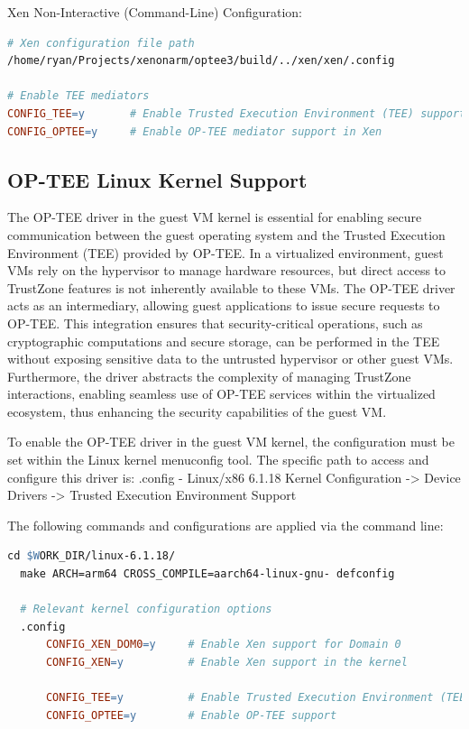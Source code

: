 \documentclass[acmtog]{acmart}
\begin{document}
Xen Non-Interactive (Command-Line) Configuration:
\begin{lstlisting}[language=make, caption=Enable OP-TEE Support in Xen]  
# Xen configuration file path  
/home/ryan/Projects/xenonarm/optee3/build/../xen/xen/.config  

# Enable TEE mediators  
CONFIG_TEE=y       # Enable Trusted Execution Environment (TEE) support  
CONFIG_OPTEE=y     # Enable OP-TEE mediator support in Xen  
\end{lstlisting}  



\subsection{OP-TEE Linux Kernel Support}
The OP-TEE driver in the guest VM kernel is essential for enabling secure communication between the guest operating system and the Trusted Execution Environment (TEE) provided by OP-TEE. In a virtualized environment, guest VMs rely on the hypervisor to manage hardware resources, but direct access to TrustZone features is not inherently available to these VMs. The OP-TEE driver acts as an intermediary, allowing guest applications to issue secure requests to OP-TEE. This integration ensures that security-critical operations, such as cryptographic computations and secure storage, can be performed in the TEE without exposing sensitive data to the untrusted hypervisor or other guest VMs. Furthermore, the driver abstracts the complexity of managing TrustZone interactions, enabling seamless use of OP-TEE services within the virtualized ecosystem, thus enhancing the security capabilities of the guest VM.

To enable the OP-TEE driver in the guest VM kernel, the configuration must be set within the Linux kernel menuconfig tool. The specific path to access and configure this driver is:
.config - Linux/x86 6.1.18 Kernel Configuration -> Device Drivers -> Trusted Execution Environment Support

The following commands and configurations are applied via the command line:
\begin{lstlisting}[language=make, caption=Enabling OP-TEE in the Linux Kernel Configuration]
  cd $WORK_DIR/linux-6.1.18/
  make ARCH=arm64 CROSS_COMPILE=aarch64-linux-gnu- defconfig
  
  # Relevant kernel configuration options
  .config
      CONFIG_XEN_DOM0=y     # Enable Xen support for Domain 0
      CONFIG_XEN=y          # Enable Xen support in the kernel
      
      CONFIG_TEE=y          # Enable Trusted Execution Environment (TEE) support
      CONFIG_OPTEE=y        # Enable OP-TEE support
  \end{lstlisting}
\end{document}
